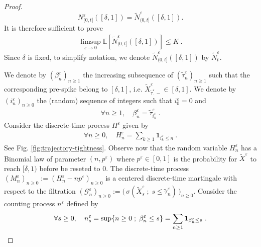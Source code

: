 \documentclass[reqno, 12pt, a4paper]{amsart}
\theoremstyle{plain}
\theoremstyle{definition}
\begin{document}
\begin{proof}
\[
N^\varepsilon_{(0,t]} ( [\delta,1]) = \tilde{N}^\varepsilon_{(0,t]}( [\delta,1]).
\]
It is therefore sufficient  to prove 
\begin{equation}
\begin{split}
\limsup_{\varepsilon \to 0} \mathbb E  \left[ {\tilde N}^\varepsilon_{(0,t]} ([\delta,1]) \right] \le K \ .
\end{split}
\end{equation}
Since $\delta$ is fixed, to simplify notation, we denote $\tilde N^\varepsilon_{(0,t]} ([\delta,1])$ by $\tilde N_t^\varepsilon$.  

\bigskip 

We denote by $(\beta^\varepsilon_n)_{n \ge 1}$ the increasing subsequence of $(\tilde \tau^\varepsilon_n)_{n \ge 1}$ such that the corresponding pre-spike belong to $[\delta, 1]$, i.e. ${\tilde X}^\varepsilon_{\tilde\tau_\cdot^\varepsilon \, - } \in [\delta, 1]$. We denote by $(i^\varepsilon_n)_{n\ge 0}$ the (random) sequence of integers such that $ i_0^\varepsilon=0$ and 
\begin{equation}
\begin{split}
\forall n \ge 1, \quad \beta_n^\varepsilon= \tilde \tau_{i_n^\varepsilon}^\varepsilon \ . 
\end{split}
\end{equation}
Consider the discrete-time process $H^\varepsilon$  given by 
\begin{equation}
\begin{split}
\forall n \ge 0, \quad H^\varepsilon_n =  \sum_{k \ge 1} {\mathbf 1}_{i^\varepsilon_k \le n} \ . 
\end{split}
\end{equation}
See Fig. \ref{fig:trajectory-tightness}. Observe now that the random variable $H_n^\varepsilon$ has a Binomial law of parameter $(n,p^\varepsilon)$ where $p^\varepsilon \in [0,1]$ is the probability for ${\tilde X}^\varepsilon$ to reach $[\delta, 1)$ before be reseted to $0$. The discrete-time process $(M_n^\varepsilon)_{n \ge 0} := (H_n^\varepsilon - n p^\varepsilon)_{n \ge 0}$ is a centered discrete-time martingale with respect to the filtration $(\mathcal G^\varepsilon_n)_{n \ge 0}:= \big( \, \sigma ( {\tilde X}^\varepsilon_s \; ; \; s \le {\tilde \tau}_n^\varepsilon) \,  \big)_{n \ge 0}$. Consider the counting process $n^\varepsilon$ defined by 
\begin{equation}
\begin{split}
\forall s \ge 0, \quad n_s^\varepsilon = \sup\{ n \ge 0 \; ; \; \beta_n^\varepsilon \le s\}= \sum_{n \ge 1} {\bf 1}_{{\beta}_n^\varepsilon \le s}  \ . 

\end{split}
\end{equation}
\end{proof}
\end{document}

